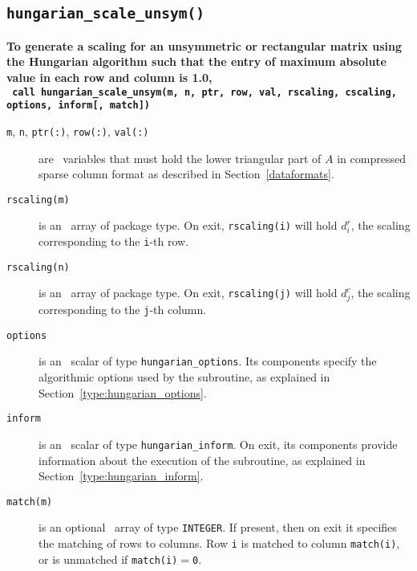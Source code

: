 \subsection{\texttt{hungarian\_scale\_unsym()}}

\textbf{\noindent
   To generate a scaling for an unsymmetric or rectangular matrix using the Hungarian algorithm such that the entry of maximum absolute value in each row and column is 1.0,
   \vspace*{0.3cm} \\
   \texttt{ \hspace*{0.2cm}
      call hungarian\_scale\_unsym(m, n, ptr, row, val, rscaling, cscaling, options, inform[, match])
   }
   \vspace{0.3cm}
}

\begin{description}

\item[\texttt{m}, \texttt{n}, \texttt{ptr(:)}, \texttt{row(:)}, \texttt{val(:)}] are \intentin\ variables that must hold the lower triangular part of $A$ in compressed sparse column format as described in Section~\ref{dataformats}.

\item[\texttt{rscaling(m)}] is an \intentout\ array of package type. On exit,
\texttt{rscaling(i)} will hold $d^r_i$, the scaling corresponding to the
\texttt{i}-th row.

\item[\texttt{rscaling(n)}] is an \intentout\ array of package type. On exit,
\texttt{rscaling(j)} will hold $d^c_j$, the scaling corresponding to the
\texttt{j}-th column.

\item[\texttt{options}] is an \intentin\ scalar of type \texttt{hungarian\_options}. Its components specify the algorithmic options used by the subroutine, as explained in Section~\ref{type:hungarian_options}.

\item[\texttt{inform}] is an \intentout\ scalar of type \texttt{hungarian\_inform}. On exit, its components provide information about the execution of the subroutine, as explained in Section~\ref{type:hungarian_inform}.

\item[\texttt{match(m)}] is an optional \intentout\ array of type {\tt INTEGER}.
If present, then on exit it specifies the matching of rows to
columns. Row \texttt{i} is matched to column \texttt{match(i)}, or is unmatched
if \texttt{match(i)}$=$\texttt{0}.

\end{description}

